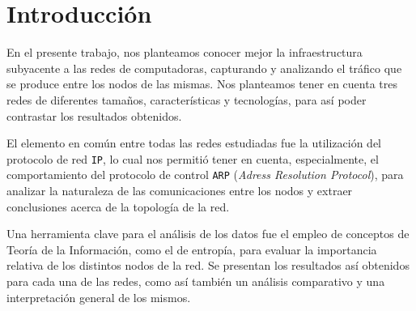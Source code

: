 \section{Introducción}

En el presente trabajo, nos planteamos conocer mejor la infraestructura
subyacente a las redes de computadoras, capturando y analizando el tráfico que
se produce entre los nodos de las mismas. Nos planteamos tener en cuenta tres
redes de diferentes tamaños, características y tecnologías, para así poder
contrastar los resultados obtenidos.

El elemento en común entre todas las redes estudiadas fue la utilización del
protocolo de red \texttt{IP}, lo cual nos permitió tener en cuenta,
especialmente, el comportamiento del protocolo de control \texttt{ARP}
(\textit{Adress Resolution Protocol}), para analizar la naturaleza de las
comunicaciones entre los nodos y extraer conclusiones acerca de la topología
de la red.

Una herramienta clave para el análisis de los datos fue el empleo de conceptos
de Teoría de la Información, como el de entropía, para evaluar la importancia
relativa de los distintos nodos de la red. Se presentan los resultados así
obtenidos para cada una de las redes, como así también un análisis comparativo
y una interpretación general de los mismos.
